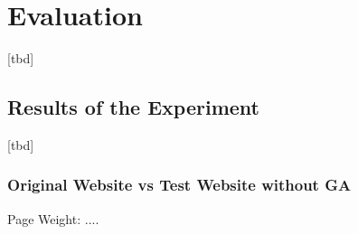 \chapter{Evaluation}

[tbd]
















\section{Results of the Experiment}

[tbd]










\subsection{Original Website vs Test Website without GA}


Page Weight: ....

